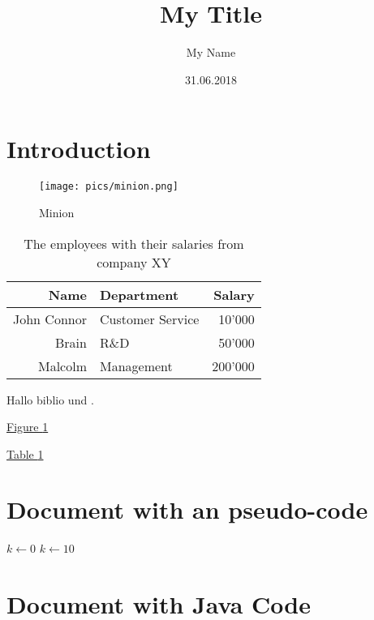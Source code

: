 \documentclass{article}
\begin{document}
\title{My Title} 
\author{My Name} 
\date{31.06.2018}
\maketitle

\tableofcontents
\newpage

\section{Introduction}

\begin{figure}[ht]
	\centering
		\texttt{[image: pics/minion.png]}
		\caption{Minion}
		\label{fig: minion}
\end{figure}



\begin{table}
\centering
 \begin{tabular}{r|l|r} 
 Name & Department & Salary \\ \hline
John Connor & Customer Service & 10'000 \\
Brain & R\&D & 50'000  \\
Malcolm & Management & 200'000\\ \hline

\end{tabular}	
\caption{The employees with their salaries from company XY}
\label{tab: salary}
\end{table}


Hallo biblio \cite{krishnan_data_2013} und \cite{yu_networking_2016}.

\hyperref[label_name]{Figure \ref*{fig: minion}}

\hyperref[table_name]{Table \ref*{tab: salary}}


\section{Document with an pseudo-code}

\begin{algorithmic} 
   \STATE $k\gets 0$
\ELSE
\STATE $k\gets 10$ \ENDIF
\end{algorithmic}

\section{Document with Java Code}
\end{document}
